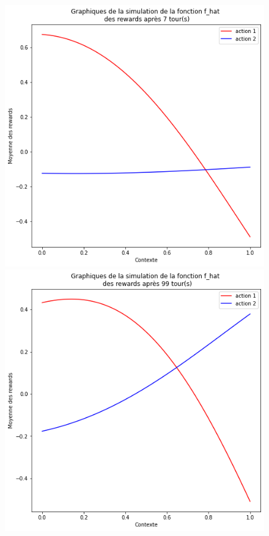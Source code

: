 \documentclass[letterpaper,11pt]{article}
\begin{document}
\begin{figure}[H]
\begin{center}
\includegraphics[scale=0.45]{KTS-7-tours.png} \hfill \includegraphics[scale=0.45]{KTS-99-tours.png}


\end{center}
\end{figure}
\end{document}
